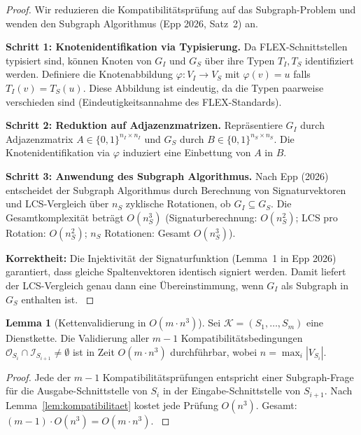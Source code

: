﻿\documentclass[a4paper,12pt]{article}
\theoremstyle{definition}
\newtheorem{lemma}{Lemma}
\begin{document}
\begin{proof}
Wir reduzieren die Kompatibilitätsprüfung auf das Subgraph-Problem und wenden den Subgraph Algorithmus (Epp 2026, Satz~2) an.

\textbf{Schritt 1: Knotenidentifikation via Typisierung.} Da FLEX-Schnittstellen typisiert sind, können Knoten von $G_I$ und $G_S$ über ihre Typen $T_I, T_S$ identifiziert werden. Definiere die Knotenabbildung $\varphi: V_I \to V_S$ mit $\varphi(v) = u$ falls $T_I(v) = T_S(u)$. Diese Abbildung ist eindeutig, da die Typen paarweise verschieden sind (Eindeutigkeitsannahme des FLEX-Standards).

\textbf{Schritt 2: Reduktion auf Adjazenzmatrizen.} Repräsentiere $G_I$ durch Adjazenzmatrix $A \in \{0,1\}^{n_I \times n_I}$ und $G_S$ durch $B \in \{0,1\}^{n_S \times n_S}$. Die Knotenidentifikation via $\varphi$ induziert eine Einbettung von $A$ in $B$.

\textbf{Schritt 3: Anwendung des Subgraph Algorithmus.} Nach Epp (2026) entscheidet der Subgraph Algorithmus durch Berechnung von Signaturvektoren und LCS-Vergleich über $n_S$ zyklische Rotationen, ob $G_I \subseteq G_S$. Die Gesamtkomplexität beträgt $O(n_S^3)$ (Signaturberechnung: $O(n_S^2)$; LCS pro Rotation: $O(n_S^2)$; $n_S$ Rotationen: Gesamt $O(n_S^3)$).

\textbf{Korrektheit:} Die Injektivität der Signaturfunktion (Lemma~1 in Epp 2026) garantiert, dass gleiche Spaltenvektoren identisch signiert werden. Damit liefert der LCS-Vergleich genau dann eine Übereinstimmung, wenn $G_I$ als Subgraph in $G_S$ enthalten ist. $
$
\end{proof}

\begin{lemma}[Kettenvalidierung in $O(m \cdot n^3)$]
\label{lem:kettenvalidierung}
Sei $\mathcal{K} = (S_1, \ldots, S_m)$ eine Dienstkette. Die Validierung aller $m-1$ Kompatibilitätsbedingungen $\mathcal{O}_{S_i} \cap \mathcal{I}_{S_{i+1}} \neq \emptyset$ ist in Zeit $O(m \cdot n^3)$ durchführbar, wobei $n = \max_i |V_{S_i}|$.
\end{lemma}

\begin{proof}
Jede der $m-1$ Kompatibilitätsprüfungen entspricht einer Subgraph-Frage für die Ausgabe-Schnittstelle von $S_i$ in der Eingabe-Schnittstelle von $S_{i+1}$. Nach Lemma~\ref{lem:kompatibilitaet} kostet jede Prüfung $O(n^3)$. Gesamt: $(m-1) \cdot O(n^3) = O(m \cdot n^3)$. $
$
\end{proof}
\end{document}
